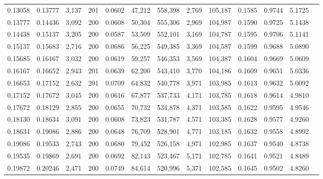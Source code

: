 \begin{tabular}{rrrrrrrrrrrrr}
0.13058 & 0.13777 & 3,137 & 201 &                                     0.0602 &  47,212 & 558,398 &   2,769 & 105,187 & 0.1585 & 0.9744 & 5.1725 \\
0.13777 & 0.14436 & 3,092 & 200 &                                     0.0608 &  50,304 & 555,306 &   2,969 & 104,987 & 0.1590 & 0.9725 & 5.1438 \\
0.14438 & 0.15137 & 3,205 & 200 &                                     0.0587 &  53,509 & 552,101 &   3,169 & 104,787 & 0.1595 & 0.9706 & 5.1141 \\
0.15137 & 0.15683 & 2,716 & 200 &                                     0.0686 &  56,225 & 549,385 &   3,369 & 104,587 & 0.1599 & 0.9688 & 5.0890 \\
0.15685 & 0.16167 & 3,032 & 200 &                                     0.0619 &  59,257 & 546,353 &   3,569 & 104,387 & 0.1604 & 0.9669 & 5.0609 \\
0.16167 & 0.16652 & 2,943 & 201 &                                     0.0639 &  62,200 & 543,410 &   3,770 & 104,186 & 0.1609 & 0.9651 & 5.0336 \\
0.16653 & 0.17152 & 2,632 & 201 &                                     0.0709 &  64,832 & 540,778 &   3,971 & 103,985 & 0.1613 & 0.9632 & 5.0092 \\
0.17152 & 0.17672 & 3,045 & 200 &                                     0.0616 &  67,877 & 537,733 &   4,171 & 103,785 & 0.1618 & 0.9614 & 4.9810 \\
0.17672 & 0.18129 & 2,855 & 200 &                                     0.0655 &  70,732 & 534,878 &   4,371 & 103,585 & 0.1622 & 0.9595 & 4.9546 \\
0.18130 & 0.18634 & 3,091 & 200 &                                     0.0608 &  73,823 & 531,787 &   4,571 & 103,385 & 0.1628 & 0.9577 & 4.9260 \\
0.18634 & 0.19086 & 2,886 & 200 &                                     0.0648 &  76,709 & 528,901 &   4,771 & 103,185 & 0.1632 & 0.9558 & 4.8992 \\
0.19086 & 0.19533 & 2,743 & 200 &                                     0.0680 &  79,452 & 526,158 &   4,971 & 102,985 & 0.1637 & 0.9540 & 4.8738 \\
0.19535 & 0.19869 & 2,691 & 200 &                                     0.0692 &  82,143 & 523,467 &   5,171 & 102,785 & 0.1641 & 0.9521 & 4.8489 \\
0.19872 & 0.20246 & 2,471 & 200 &                                     0.0749 &  84,614 & 520,996 &   5,371 & 102,585 & 0.1645 & 0.9502 & 4.8260 \\

\end{tabular}
